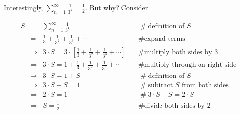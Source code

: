 \documentclass[11pt, oneside]{article}   	%
\begin{document}
Interestingly, $\sum\limits_{n = 1}^\infty   \frac{1}{3^k}  = \frac{1}{2}$. But why? Consider 
      
\begin{equation*}
\begin{array}{lllll}
S
&=&   \sum\limits_{n = 1}^\infty   \frac{1}{3^k}                                                                     &\quad  \mathrel{\#} \text{definition of $S$}                    \\ 
&=& \frac{1}{3} + \frac{1}{3^2} + \frac{1}{3^3} + \cdots                                                       &\quad  \mathrel{\#} \text{expand terms}                         \\
&\Rightarrow& 3 \cdot S = 3 \cdot [\frac{1}{3} + \frac{1}{3^2} + \frac{1}{3^3} + \cdots ]      &\quad  \mathrel{\#} \text{multiply both sides by 3}         \\
&\Rightarrow& 3 \cdot S = 1 + \frac{1}{3} + \frac{1}{3^2} + \frac{1}{3^3} + \cdots               &\quad  \mathrel{\#} \text{multiply through on right side} \\
&\Rightarrow& 3 \cdot S = 1 + S                                                                                         &\quad  \mathrel{\#} \text{definition of $S$}                      \\
&\Rightarrow& 3 \cdot S - S = 1                                                                                          &\quad  \mathrel{\#} \text{subtract $S$ from both sides}  \\
&\Rightarrow& 2 \cdot S  = 1                                                                                               &\quad  \mathrel{\#} 3 \cdot S - S = 2 \cdot S                   \\
&\Rightarrow& S  = \frac{1}{2}                                                                                             &\quad  \mathrel{\#} \text{divide both sides by 2} 
\end{array}
\end{equation*}
\end{document}
